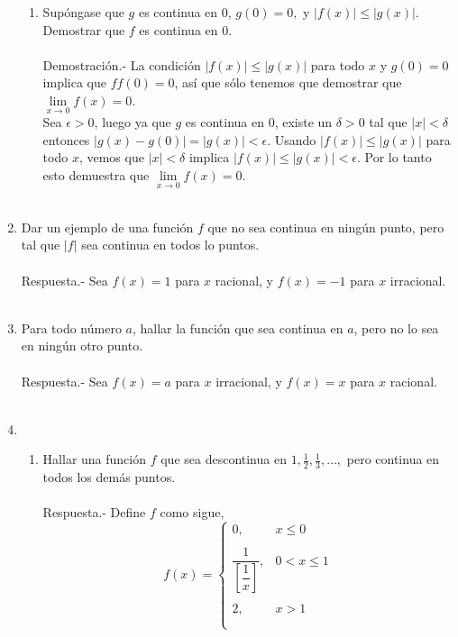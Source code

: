 \begin{enumerate}
\begin{enumerate}
	\item Supóngase que $g$ es continua en $0$, $g(0)=0,$ y $|f(x)|\leq |g(x)|.$ Demostrar que $f$ es continua en $0$.\\\\
	    Demostración.-\; La condición $|f(x)|\leq |g(x)|$ para todo $x$ y $g(0)=0$ implica que $ff(0)=0$, así que sólo tenemos que demostrar que $\lim\limits_{x\to 0} f(x) = 0$.\\
	    Sea $\epsilon>0$, luego ya que $g$ es continua en $0$, existe un $\delta >0$ tal que $|x|<\delta$ entonces $|g(x)-g(0)|=|g(x)|<\epsilon$. Usando $|f(x)|\leq |g(x)|$ para todo $x$, vemos que $|x|<\delta$ implica $|f(x)|\leq |g(x)|<\epsilon$. Por lo tanto esto demuestra que $\lim\limits_{x\to 0} f(x) = 0$.\\\\

    \end{enumerate}

\item Dar un ejemplo de una función $f$ que no sea continua en ningún punto, pero tal que $|f|$ sea continua en todos lo puntos.\\\\
    Respuesta.-\; Sea $f(x)=1$ para $x$ racional, y $f(x)=-1$ para $x$ irracional.\\\\

\item Para todo número $a$, hallar la función que sea continua en $a$, pero no lo sea en ningún otro punto.\\\\
    Respuesta.-\; Sea $f(x)=a$ para $x$ irracional, y $f(x)=x$ para $x$ racional.\\\\

\item 
\begin{enumerate}[\bfseries (a)]

    \item Hallar una función $f$ que sea descontinua en $1,\frac{1}{2},\frac{1}{3},\ldots,$ pero continua en todos los demás puntos.\\\\
	Respuesta.-\; Define $f$ como sigue,
	$$f(x) = \left\{\begin{array}{rl}
	0,&x\leq 0\\\\
	\dfrac{1}{\left[\dfrac{1}{x}\right]},&0<x\leq 1\\\\
	  2,&x>1\\\\
	\end{array}\right.$$


\end{enumerate}
\end{enumerate}
